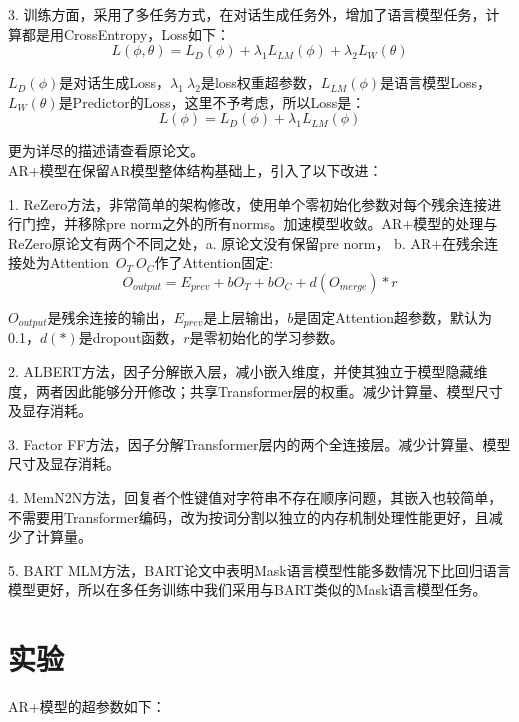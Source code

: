 \documentclass[letterpaper]{article} %
\DeclareRobustCommand{\citeext}[1]{\cite[#1]{#1}}
\begin{document}
\begin{CJK*}{UTF8}{gbsn}
3. 训练方面，采用了多任务方式，在对话生成任务外，增加了语言模型任务，计算都是用CrossEntropy，Loss如下：
\begin{equation}
L(\phi, \theta) = L_D(\phi) + \lambda_1L_{LM}(\phi) + \lambda_2L_W(\theta)
\end{equation}

$L_D(\phi)$是对话生成Loss，$\lambda_1~\lambda_2$是loss权重超参数，$L_{LM}(\phi)$是语言模型Loss，\\$L_W(\theta)$是Predictor的Loss，这里不予考虑，所以Loss是：
\begin{equation}
L(\phi) = L_D(\phi) + \lambda_1L_{LM}(\phi)
\end{equation}

更为详尽的描述请查看原论文\citeext{Zheng2019}。\\

AR+模型在保留AR模型整体结构基础上，引入了以下改进：

1. ReZero\citeext{Bachlechner2020}方法，非常简单的架构修改，使用单个零初始化参数对每个残余连接进行门控，并移除pre norm之外的所有norms。加速模型收敛。AR+模型的处理与ReZero原论文有两个不同之处，a. 原论文没有保留pre norm， b. AR+在残余连接处为Attention~$O_T~O_C$作了Attention固定:
\begin{equation}
O_{output} = E_{prev} + bO_T + bO_C + d(O_{merge}) * r
\end{equation}

$O_{output}$是残余连接的输出，$E_{prev}$是上层输出，$b$是固定Attention超参数，默认为0.1，$d(*)$是dropout函数，$r$是零初始化的学习参数。

2. ALBERT\citeext{Lan2019}方法，因子分解嵌入层，减小嵌入维度，并使其独立于模型隐藏维度，两者因此能够分开修改；共享Transformer层的权重。减少计算量、模型尺寸及显存消耗。

3. Factor FF方法，因子分解Transformer层内的两个全连接层。减少计算量、模型尺寸及显存消耗。

4. MemN2N\citeext{Sukhbaatar2015}方法，回复者个性键值对字符串不存在顺序问题，其嵌入也较简单，不需要用Transformer编码，改为按词分割以独立的内存机制处理性能更好，且减少了计算量。

5. BART MLM\citeext{Lewis2019}方法，BART论文中表明Mask语言模型性能多数情况下比回归语言模型更好，所以在多任务训练中我们采用与BART类似的Mask语言模型任务。

\section[Experiments]{实验} 
AR+模型的超参数如下：


\end{CJK*}
\end{document}
